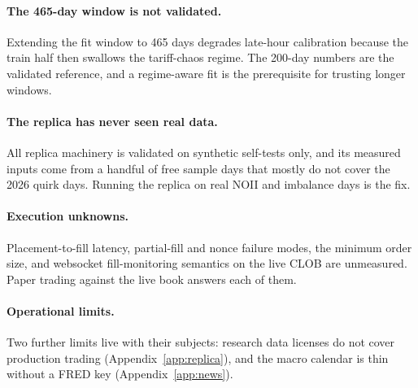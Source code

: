 \paragraph{The 465-day window is not validated.} Extending the fit window
to 465 days degrades late-hour calibration because the train half then
swallows the tariff-chaos regime. The 200-day numbers are the validated
reference, and a regime-aware fit is the prerequisite for trusting longer
windows.

\paragraph{The replica has never seen real data.} All replica machinery is
validated on synthetic self-tests only, and its measured inputs come from
a handful of free sample days that mostly do not cover the 2026 quirk
days. Running the replica on real NOII and imbalance days is the fix.

\paragraph{Execution unknowns.} Placement-to-fill latency, partial-fill
and nonce failure modes, the minimum order size, and websocket
fill-monitoring semantics on the live CLOB are unmeasured. Paper trading
against the live book answers each of them.

\paragraph{Operational limits.} Two further limits live with their
subjects: research data licenses do not cover production trading
(Appendix~\ref{app:replica}), and the macro calendar is thin without a
FRED key (Appendix~\ref{app:news}).
